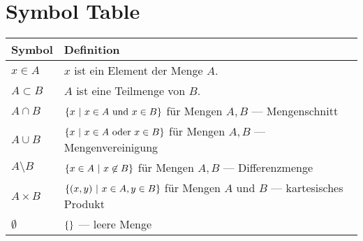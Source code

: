 \documentclass[crop=false,10pt,ngerman]{standalone}
\begin{document}
  \section*{Symbol Table}
  \renewcommand{\arraystretch}{1.3}
  \begin{table}[H]
    \scriptsize
    \begin{tabularx}{\textwidth}{p{}p{}}
      \hline
      \textbf{Symbol} & \textbf{Definition} \\
      \hline
      \hline

      $x\in A$ & $x$ ist ein Element der Menge $A$. \\

      $A\subset B$ & $A$ ist eine Teilmenge von $B$. \\

      $A\cap B$ & $\set{x}{x\in A \text{ und } x\in B}$ für Mengen $A,B$ --- Mengenschnitt \\

      $A\cup B$ & $\set{x}{x\in A \text{ oder } x\in B}$ für Mengen $A,B$ --- Mengenvereinigung \\

      $A\setminus B$ & $\set{x\in A}{x\not\in B}$ für Mengen $A,B$ --- Differenzmenge \\

      $A\times B$ & $\set{(x,y)}{x\in A,y\in B}$ für Mengen $A$ und $B$ --- kartesisches Produkt \\

      $\emptyset$ & $\set{}{}$ --- leere Menge \\


\end{tabularx}
\end{table}
\end{document}
